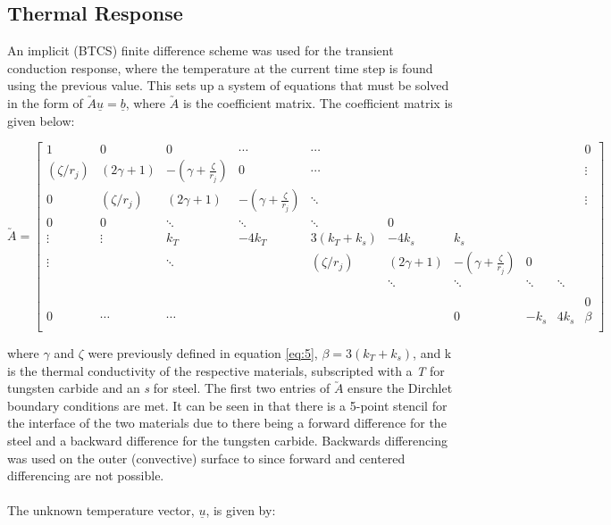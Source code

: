 \documentclass[times]{nmeauth}
\begin{document}
\subsection{Thermal Response}
An implicit (BTCS) finite difference scheme was used for the transient conduction response, where the temperature at the current time step is found using the previous value. This sets up a system of equations that must be solved in the form of $\utilde{A}\underline{u}=\underline{b}$, where $\utilde{A}$ is the coefficient matrix. The coefficient matrix is given below:\\
\begin{center}
$\utilde{A}=
				\left[ \begin{matrix}
				   1 & 0 & 0 & \cdots  & \cdots  & {} & {} & {} & {} & 0  \\
				   \left( \zeta /{{r}_{j}} \right) & \left( 2\gamma +1 \right) & -\left( \gamma +\frac{\zeta }{{{r}_{j}}} \right) & 0 & \cdots  & {} & {} & {} & {} & \vdots   \\
				   0 & \left( \zeta /{{r}_{j}} \right) & \left( 2\gamma +1 \right) & -\left( \gamma +\frac{\zeta }{{{r}_{j}}} \right) & \ddots  & {} & {} & {} & {} & \vdots   \\
				   0 & 0 & \ddots  & \ddots  & \ddots  & 0 & {} & {} & {} & {}  \\
				   \vdots  & \vdots  & {{k}_{T}} & -4{{k}_{T}} & 3\left( {{k}_{T}}+{{k}_{s}} \right) & -4{{k}_{s}} & {{k}_{s}} & {} & {} & {}  \\
				   \vdots  & {} & \ddots  & {} & \left( \zeta /{{r}_{j}} \right) & \left( 2\gamma +1 \right) & -\left( \gamma +\frac{\zeta }{{{r}_{j}}} \right) & 0 & {} & {}  \\
				   {} & {} & {} & {} & {} & \ddots  & \ddots  & \ddots  & \ddots  & {}  \\
				   {} & {} & {} & {} & {} & {} & {} & {} & {} & {}  \\
				   {} & {} & {} & {} & {} & {} & {} & {} & {} & 0  \\
				   0 & \cdots  & \cdots  & {} & {} & {} & 0 & -{{k}_{s}} & 4{{k}_{s}} & \beta \\
				\end{matrix} \right]$								
\end{center}
where $\gamma$ and $\zeta$ were previously defined in equation \eqref{eq:5}, $\beta =3\left( {{k}_{T}}+{{k}_{s}} \right)$, and k is the thermal conductivity of the respective materials, subscripted with a \emph{T} for tungsten carbide and an \emph{s} for steel. The first two entries of $\utilde{A}$ ensure the Dirchlet boundary conditions are met. It can be seen in that there is a 5-point stencil for the interface of the two materials due to there being a forward difference for the steel and a backward difference for the tungsten carbide. Backwards differencing was used on the outer (convective) surface to since forward and centered differencing are not possible.\\\\
The unknown temperature vector, $\underline{u}$, is given by:
\end{document}
